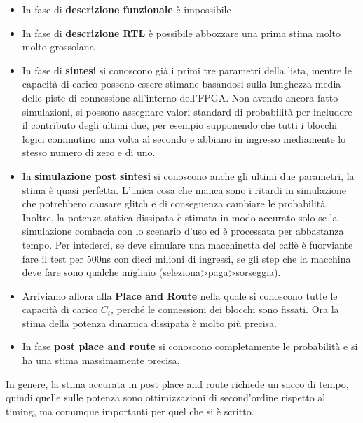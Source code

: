 \documentclass{book}
\begin{document}
        \begin{itemize}
            \item In fase di \textbf{descrizione funzionale} è impossibile
            \item In fase di \textbf{descrizione RTL} è possibile abbozzare una prima stima molto molto grossolana
            \item In fase di \textbf{sintesi} si conoscono già i primi tre parametri della lista, mentre le capacità 
            di carico possono essere stimane basandosi sulla lunghezza media delle piste di connessione all'interno dell'FPGA. Non avendo ancora fatto 
            simulazioni, si possono assegnare valori standard di probabilità per includere il contributo degli ultimi due, per esempio supponendo che tutti i blocchi logici 
            commutino una volta al secondo e abbiano in ingresso mediamente lo stesso numero di zero e di uno.
            \item In \textbf{simulazione post sintesi} si conoscono anche gli ultimi due parametri, la stima è quasi perfetta. L'unica cosa che manca sono i ritardi in simulazione 
            che potrebbero causare glitch e di conseguenza cambiare le probabilità. Inoltre, la potenza statica dissipata
            è stimata in modo accurato solo se la simulazione combacia con lo scenario d'uso ed è processata per abbastanza tempo. Per intederci,
            se deve simulare una macchinetta del caffè è fuorviante fare il test per 500ns con dieci milioni di ingressi, se gli step che la macchina 
            deve fare sono qualche migliaio (seleziona>paga>sorseggia). 
            \item Arriviamo allora alla \textbf{Place and Route} nella quale si conoscono tutte le capacità di carico $C_{i}$,
            perché le connessioni dei blocchi sono fissati. Ora la stima della potenza dinamica dissipata è molto più precisa.
            \item In fase \textbf{post place and route} si conoscono completamente le probabilità e si ha una stima massimamente precisa.
        \end{itemize}
        In genere, la stima accurata in post place and route richiede un sacco di tempo, quindi quelle sulle potenza sono ottimizzazioni
        di second'ordine rispetto al timing, ma comunque importanti per quel che si è scritto.
        
\end{document}
